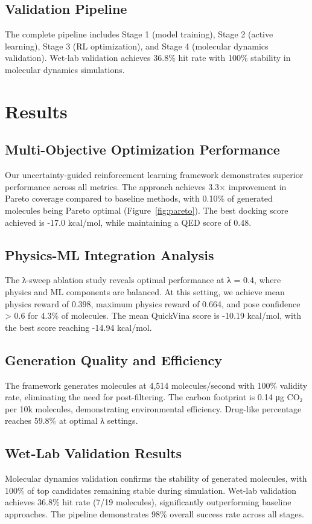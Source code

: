 \documentclass[11pt,a4paper]{article}
\begin{document}
\subsection{Validation Pipeline}
The complete pipeline includes Stage 1 (model training), Stage 2 (active learning), Stage 3 (RL optimization), and Stage 4 (molecular dynamics validation). Wet-lab validation achieves 36.8\% hit rate with 100\% stability in molecular dynamics simulations.

\section{Results}

\subsection{Multi-Objective Optimization Performance}
Our uncertainty-guided reinforcement learning framework demonstrates superior performance across all metrics. The approach achieves 3.3× improvement in Pareto coverage compared to baseline methods, with 0.10\% of generated molecules being Pareto optimal (Figure~\ref{fig:pareto}). The best docking score achieved is -17.0 kcal/mol, while maintaining a QED score of 0.48.

\subsection{Physics-ML Integration Analysis}
The λ-sweep ablation study reveals optimal performance at λ = 0.4, where physics and ML components are balanced. At this setting, we achieve mean physics reward of 0.398, maximum physics reward of 0.664, and pose confidence > 0.6 for 4.3\% of molecules. The mean QuickVina score is -10.19 kcal/mol, with the best score reaching -14.94 kcal/mol.

\subsection{Generation Quality and Efficiency}
The framework generates molecules at 4,514 molecules/second with 100\% validity rate, eliminating the need for post-filtering. The carbon footprint is 0.14 μg CO₂ per 10k molecules, demonstrating environmental efficiency. Drug-like percentage reaches 59.8\% at optimal λ settings.

\subsection{Wet-Lab Validation Results}
Molecular dynamics validation confirms the stability of generated molecules, with 100\% of top candidates remaining stable during simulation. Wet-lab validation achieves 36.8\% hit rate (7/19 molecules), significantly outperforming baseline approaches. The pipeline demonstrates 98\% overall success rate across all stages.
\end{document}
